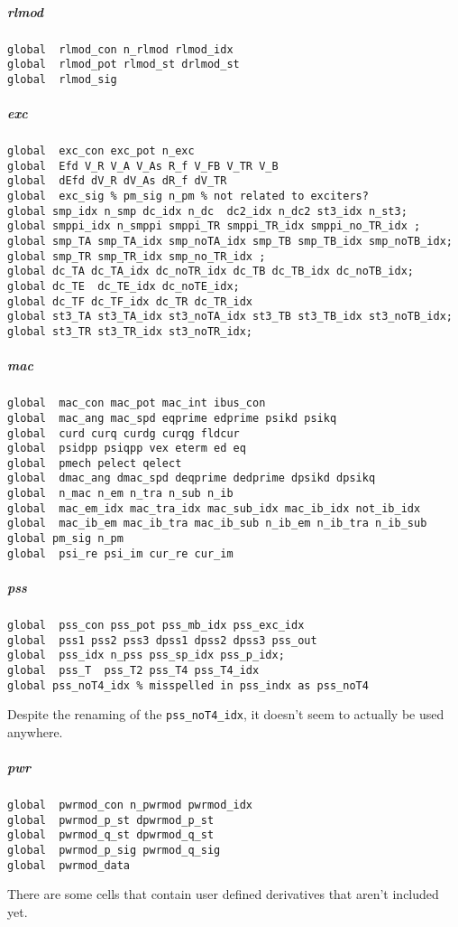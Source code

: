 \documentclass[12pt]{article}
\begin{document}
\subparagraph{rlmod}
\begin{verbatim}
global  rlmod_con n_rlmod rlmod_idx
global  rlmod_pot rlmod_st drlmod_st
global  rlmod_sig
\end{verbatim}
\subparagraph{exc}
\begin{verbatim}
global  exc_con exc_pot n_exc
global  Efd V_R V_A V_As R_f V_FB V_TR V_B
global  dEfd dV_R dV_As dR_f dV_TR
global  exc_sig % pm_sig n_pm % not related to exciters?
global smp_idx n_smp dc_idx n_dc  dc2_idx n_dc2 st3_idx n_st3;
global smppi_idx n_smppi smppi_TR smppi_TR_idx smppi_no_TR_idx ;
global smp_TA smp_TA_idx smp_noTA_idx smp_TB smp_TB_idx smp_noTB_idx;
global smp_TR smp_TR_idx smp_no_TR_idx ;
global dc_TA dc_TA_idx dc_noTR_idx dc_TB dc_TB_idx dc_noTB_idx;
global dc_TE  dc_TE_idx dc_noTE_idx;
global dc_TF dc_TF_idx dc_TR dc_TR_idx
global st3_TA st3_TA_idx st3_noTA_idx st3_TB st3_TB_idx st3_noTB_idx;
global st3_TR st3_TR_idx st3_noTR_idx;
\end{verbatim}
\subparagraph{mac}
\begin{verbatim}
global  mac_con mac_pot mac_int ibus_con
global  mac_ang mac_spd eqprime edprime psikd psikq
global  curd curq curdg curqg fldcur
global  psidpp psiqpp vex eterm ed eq
global  pmech pelect qelect
global  dmac_ang dmac_spd deqprime dedprime dpsikd dpsikq
global  n_mac n_em n_tra n_sub n_ib
global  mac_em_idx mac_tra_idx mac_sub_idx mac_ib_idx not_ib_idx
global  mac_ib_em mac_ib_tra mac_ib_sub n_ib_em n_ib_tra n_ib_sub
global pm_sig n_pm 
global  psi_re psi_im cur_re cur_im
\end{verbatim}
\subparagraph{pss}
\begin{verbatim}
global  pss_con pss_pot pss_mb_idx pss_exc_idx
global  pss1 pss2 pss3 dpss1 dpss2 dpss3 pss_out
global  pss_idx n_pss pss_sp_idx pss_p_idx;
global  pss_T  pss_T2 pss_T4 pss_T4_idx  
global pss_noT4_idx % misspelled in pss_indx as pss_noT4
\end{verbatim}
Despite the renaming of the \verb|pss_noT4_idx|, it doesn't seem to actually be used anywhere.
\subparagraph{pwr}
\begin{verbatim}
global  pwrmod_con n_pwrmod pwrmod_idx
global  pwrmod_p_st dpwrmod_p_st
global  pwrmod_q_st dpwrmod_q_st
global  pwrmod_p_sig pwrmod_q_sig
global  pwrmod_data
\end{verbatim}
There are some cells that contain user defined derivatives that aren't included yet.
\end{document}
